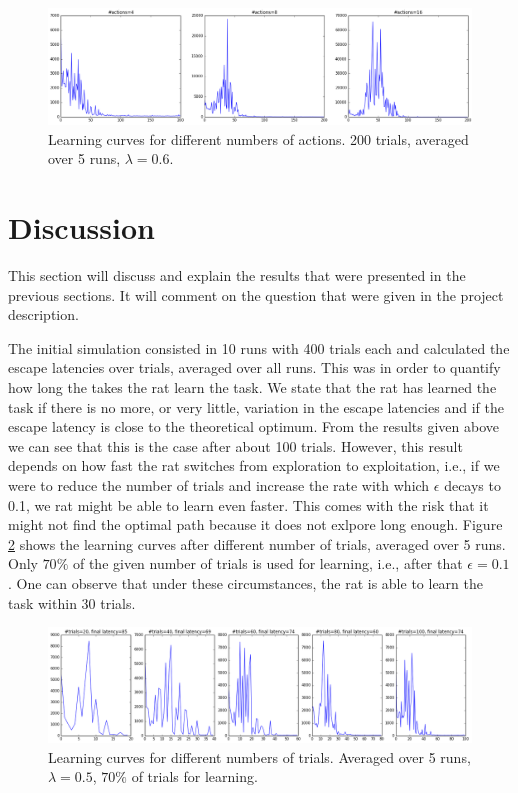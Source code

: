 \begin{figure}[h]
\centering
\includegraphics[width=1\textwidth]{figures/learning_curve_actions.png}
\caption{\label{fig:lc_act} Learning curves for different numbers of actions. 200 trials, averaged over 5 runs, $\lambda=0.6$.}
\end{figure}

\section{Discussion}
This section will discuss and explain the results that were presented in the previous sections. It will comment on the question that were given in the project description. 

The initial simulation consisted in 10 runs with 400 trials each and calculated the escape latencies over trials, averaged over all runs. This was in order to quantify how long the takes the rat learn the task. We state that the rat has learned the task if there is no more, or very little, variation in the escape latencies and if the escape latency is close to the theoretical optimum. From the results given above we can see that this is the case after about 100 trials. However, this result depends on how fast the rat switches from exploration to exploitation, i.e., if we were to reduce the number of trials and increase the rate with which $\epsilon$ decays to 0.1, we rat might be able to learn even faster. This comes with the risk that it might not find the optimal path because it does not exlpore long enough. Figure \ref{fig:lc_trials} shows the learning curves after different number of trials, averaged over 5 runs. Only $70\%$ of the given number of trials is used for learning, i.e., after that $\epsilon=0.1$. One can observe that under these circumstances, the rat is able to learn the task within 30 trials. 

\begin{figure}[h]
\centering
\includegraphics[width=1\textwidth]{figures/learning_curve_trials.png}
\caption{\label{fig:lc_trials} Learning curves for different numbers of trials. Averaged over 5 runs, $\lambda=0.5$, $70\%$ of trials for learning.}
\end{figure}

